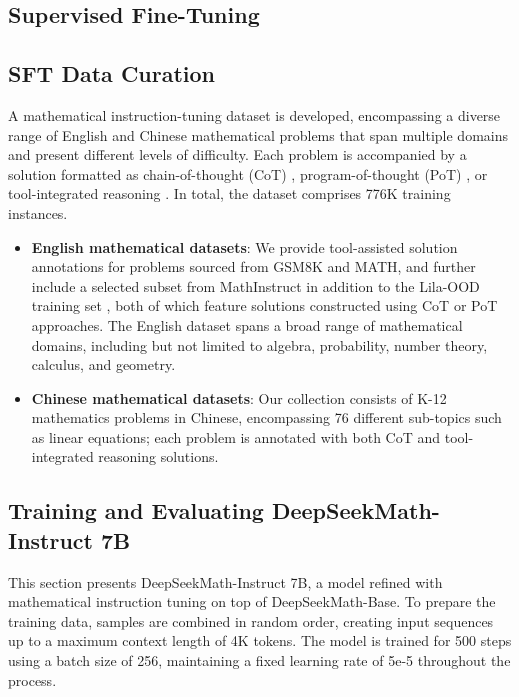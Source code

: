 \begin{itemize}[topsep=0pt]
\section{Supervised Fine-Tuning}

\subsection{SFT Data Curation}

A mathematical instruction-tuning dataset is developed, encompassing a diverse range of English and Chinese mathematical problems that span multiple domains and present different levels of difficulty. Each problem is accompanied by a solution formatted as chain-of-thought (CoT) \citep{cot}, program-of-thought (PoT) \citep{pot,pal}, or tool-integrated reasoning \citep{tora}. In total, the dataset comprises 776K training instances.

\begin{itemize}[topsep=0pt]
    \item \textbf{English mathematical datasets}: We provide tool-assisted solution annotations for problems sourced from GSM8K and MATH, and further include a selected subset from MathInstruct \citep{MathInstruct} in addition to the Lila-OOD training set \citep{lila}, both of which feature solutions constructed using CoT or PoT approaches. The English dataset spans a broad range of mathematical domains, including but not limited to algebra, probability, number theory, calculus, and geometry.
    \item \textbf{Chinese mathematical datasets}: Our collection consists of K-12 mathematics problems in Chinese, encompassing 76 different sub-topics such as linear equations; each problem is annotated with both CoT and tool-integrated reasoning solutions.
\end{itemize}

\subsection{Training and Evaluating DeepSeekMath-Instruct 7B}

This section presents DeepSeekMath-Instruct 7B, a model refined with mathematical instruction tuning on top of DeepSeekMath-Base. To prepare the training data, samples are combined in random order, creating input sequences up to a maximum context length of 4K tokens. The model is trained for 500 steps using a batch size of 256, maintaining a fixed learning rate of 5e-5 throughout the process.


\end{itemize}
